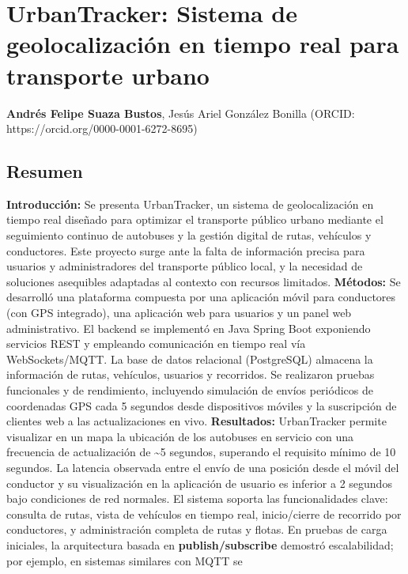 \documentclass[
]{article}
\author{}
\date{}
\begin{document}
\section{UrbanTracker: Sistema de geolocalización en tiempo real para
transporte
urbano}\label{urbantracker-sistema-de-geolocalizaciuxf3n-en-tiempo-real-para-transporte-urbano}

\textbf{Andrés Felipe Suaza Bustos}, Jesús Ariel González Bonilla
(ORCID: https://orcid.org/0000-0001-6272-8695)

\subsection{Resumen}\label{resumen}

\textbf{Introducción:} Se presenta UrbanTracker, un sistema de
geolocalización en tiempo real diseñado para optimizar el transporte
público urbano mediante el seguimiento continuo de autobuses y la
gestión digital de rutas, vehículos y conductores. Este proyecto surge
ante la falta de información precisa para usuarios y administradores del
transporte público local, y la necesidad de soluciones asequibles
adaptadas al contexto con recursos limitados. \textbf{Métodos:} Se
desarrolló una plataforma compuesta por una aplicación móvil para
conductores (con GPS integrado), una aplicación web para usuarios y un
panel web administrativo. El backend se implementó en Java Spring Boot
exponiendo servicios REST y empleando comunicación en tiempo real vía
WebSockets/MQTT. La base de datos relacional (PostgreSQL) almacena la
información de rutas, vehículos, usuarios y recorridos. Se realizaron
pruebas funcionales y de rendimiento, incluyendo simulación de envíos
periódicos de coordenadas GPS cada 5 segundos desde dispositivos móviles
y la suscripción de clientes web a las actualizaciones en vivo.
\textbf{Resultados:} UrbanTracker permite visualizar en un mapa la
ubicación de los autobuses en servicio con una frecuencia de
actualización de \textasciitilde5 segundos, superando el requisito
mínimo de 10 segundos. La latencia observada entre el envío de una
posición desde el móvil del conductor y su visualización en la
aplicación de usuario es inferior a 2 segundos bajo condiciones de red
normales. El sistema soporta las funcionalidades clave: consulta de
rutas, vista de vehículos en tiempo real, inicio/cierre de recorrido por
conductores, y administración completa de rutas y flotas. En pruebas de
carga iniciales, la arquitectura basada en \textbf{publish/subscribe}
demostró escalabilidad; por ejemplo, en sistemas similares con MQTT se
\end{document}
